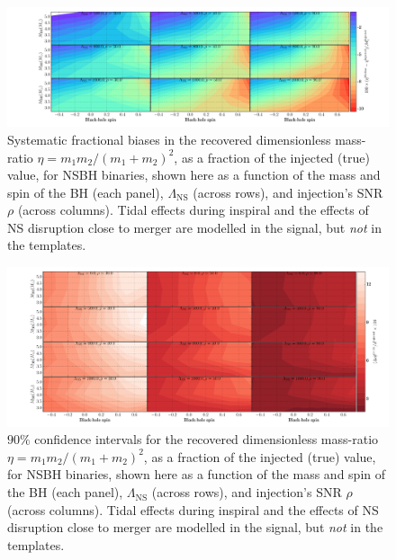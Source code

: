 \documentclass[aps,prd,amsmath,floats,floatfix, twocolumn,
superscriptaddress,nofootinbib,showpacs]{revtex4-1}
\newcommand{\lambdans}{\Lambda_\mathrm{NS}}
\begin{document}
\begin{figure}[!t]
\centering    
\includegraphics[trim={{0.4\columnwidth} 0 0 0},width=2.2\columnwidth]{plots-TN/TN_EtaBiases_Lambda_SNR.pdf}
\caption{Systematic fractional biases in the recovered dimensionless mass-ratio
$\eta = m_1 m_2 / (m_1+m_2)^2$, as a
fraction of the injected (true) value, for NSBH binaries, shown here as a 
function of the mass and spin of the BH (each panel), $\lambdans$ (across 
rows), and injection's SNR $\rho$ (across columns). Tidal effects during
inspiral and the effects of NS disruption close to merger are modelled in the
signal, but \textit{not} in the templates. }
\label{fig:TNT_EtaBias_vs_SNR_q23}
\end{figure}
% 
\begin{figure}
\centering    
\includegraphics[trim={{0.4\columnwidth} 0 0 0},width=2.2\columnwidth]{plots-TN/TN_EtaCIWidths68_3_Lambda_SNR.pdf}
\caption{$90\%$ confidence intervals for the recovered dimensionless mass-ratio
$\eta = m_1 m_2 / (m_1+m_2)^2$, as a
fraction of the injected (true) value, for NSBH binaries, shown here as a 
function of the mass and spin of the BH (each panel), $\lambdans$ (across 
rows), and injection's SNR $\rho$ (across columns). Tidal effects during
inspiral and the effects of NS disruption close to merger are modelled in the
signal, but \textit{not} in the templates. }
\label{fig:TNT_EtaCIWidth90_vs_SNR_q23}
\end{figure}
% 
\end{document}
